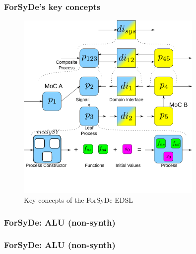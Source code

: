         \begin{frame}
            \frametitle{ForSyDe's key concepts}
            \begin{figure}[h!]
                \centerline{\includegraphics[width=0.8\textwidth]{imgs/forsyde-model.pdf}}
                \caption{Key concepts of the ForSyDe EDSL
                    \label{fig:forsyde-model}}
            \end{figure}
        \end{frame}

        \begin{frame}
            \frametitle{ForSyDe: ALU (non-synth)}
        \end{frame}

        \begin{frame}
            \frametitle{ForSyDe: ALU (non-synth)}
        \end{frame}

